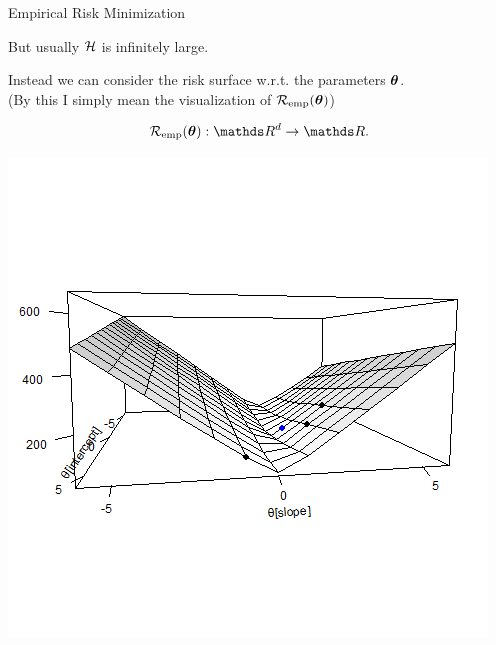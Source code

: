 \documentclass[11pt,compress,t,notes=noshow, xcolor=table]{beamer}
\begin{document}
\begin{vbframe}{Empirical Risk Minimization}

But usually $\mathcal{H}$ is infinitely large. 

\lz

Instead we can consider the risk surface w.r.t. the parameters $\bm{\theta}$.\\
(By this I simply mean the visualization of $\mathcal{R}_{\text{emp}}(\bm{\theta})$)

\begin{table}
\begin{minipage}{0.4\linewidth}
$$\risket : \R^d \to \R.$$
\end{minipage}\hfill
	\begin{minipage}{0.55\linewidth}
\includegraphics[width=\textwidth]{figure/ml-basic-riskmin-error-surface.png}
\end{minipage}
\end{table}



\end{vbframe}
\end{document}
